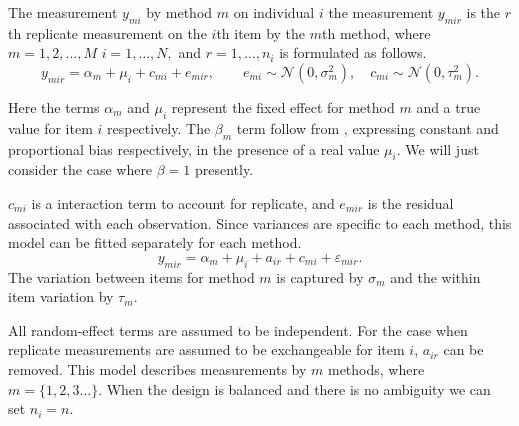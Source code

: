 \documentclass[12pt, a4paper]{report}
\theoremstyle{plain}
\theoremstyle{definition}
\theoremstyle{remark}
\begin{document}
	
	The measurement $y_{mi}$ by method $m$ on individual $i$ the measurement $y_{mir} $ is the $r$th replicate measurement on the $i$th item by the $m$th method, where $m=1,2,\ldots,M$ $i=1,\ldots,N,$ and $r = 1,\ldots,n_i$ is formulated as follows.
%	
%	
	\begin{equation}
	y_{mir}  = \alpha_{m} + \mu_{i} + c_{mi} + e_{mir}, \qquad  e_{mi}
	\sim \mathcal{N}(0,\sigma^{2}_{m}), \quad c_{mi} \sim \mathcal{N}(0,\tau^{2}_{m}).
	\end{equation}

	Here the terms $\alpha_{m}$ and $\mu_{i}$ represent the fixed effect for method $m$ and a true value for item $i$ respectively. The $\beta_{m}$ term follow from \citet{DunnSEME}, expressing constant and proportional bias respectively, in the presence of a real value $\mu_{i}.$ We will just consider the case where $\beta=1$ presently. 
	
	
	
	$c_{mi}$ is a interaction term to account for replicate, and $e_{mir}$ is the residual associated with each observation. Since variances are specific to each method, this model can be fitted separately for each method.
	\begin{equation}\label{BXC-model}
	y_{mir}  = \alpha_{m} + \mu_{i} + a_{ir} + c_{mi} + \varepsilon_{mir}.
	\end{equation}
	The variation between items for method $m$ is captured by $\sigma_m$ and the within item variation by $\tau_m$.	
	
	All random-effect terms are assumed to be independent. For the case when replicate measurements are assumed to be exchangeable for item $i$, $a_{ir}$ can be removed. This model describes measurements by $m$ methods, where $m = \{1,2,3\ldots\}$. When the design is balanced and there is no ambiguity we can set $n_i=n$.
	
\end{document}

